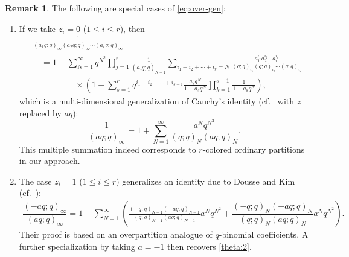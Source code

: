 \documentclass[12pt,reqno]{amsart}
\numberwithin{equation}{section}
\theoremstyle{plain}
\theoremstyle{definition}
\newtheorem{remark}[theorem]{Remark}
\begin{document}
\begin{remark}\label{rmk}
The following are special cases of \eqref{eq:over-gen}:

\begin{enumerate}[1).]
\item If we take $z_i=0$ ($1\le i\le r$), then
\begin{align}
&\frac{1}{(a_{1}q;q)_{\infty}(a_{2}q;q)_{\infty}\cdots(a_{r}q;q)_{\infty}}\nonumber\\
&\quad=1+\sum_{N=1}^{\infty}q^{N^{2}}\prod_{j=1}^{r}\frac{1}{(a_{j}q;q)_{N-1}} \sum_{i_{1}+i_{2}+\cdots+i_{r}=N}\frac{a_{1}^{i_{1}}a_{2}^{i_{2}}\cdots a_{r}^{i_{r}}}{(q;q)_{i_{1}}(q;q)_{i_{2}}\cdots(q;q)_{i_{r}}}\nonumber\\
&\quad\quad\quad\quad\quad\times \left(1+\sum_{s=1}^{r}q^{i_1+i_2+\cdots+i_{s-1}}\frac{a_s q^N}{1-a_s q^N} \prod_{k=1}^{s-1}\frac{1}{1-a_k q^N}\right),\label{eq:mul-ptn}
\end{align}
which is a multi-dimensional generalization of Cauchy's identity (cf.~\cite[Eq.~(2.2.8)]{Andr} with $z$ replaced by $aq$):
$$\frac{1}{(aq;q)_\infty}=1+\sum_{N=1}^\infty \frac{a^N q^{N^2}}{(q;q)_N (aq;q)_N}.$$
This multiple summation indeed corresponds to $r$-colored ordinary partitions in our approach.

\item The case $z_i=1$ ($1\le i\le r$) generalizes an identity due to Dousse and Kim (cf.~\cite[Corollary 3.5]{DK}):
\begin{align*}
\dfrac{(-aq;q)_{\infty}}{(aq;q)_{\infty}}=1+\sum_{N=1}^{\infty}\left(\frac{(-q;q)_{N-1}(-aq;q)_{N-1}}{(q;q)_{N-1}(aq;q)_{N-1}}a^{N}q^{N^{2}}+\dfrac{(-q;q)_{N}(-aq;q)_{N}}
{(q;q)_{N}(aq;q)_{N}}a^{N}q^{N^{2}}\right).
\end{align*}
Their proof is based on an overpartition analogue of $q$-binomial coefficients. A further specialization by taking $a=-1$ then recovers \eqref{theta:2}.


\end{enumerate}
\end{remark}
\end{document}
